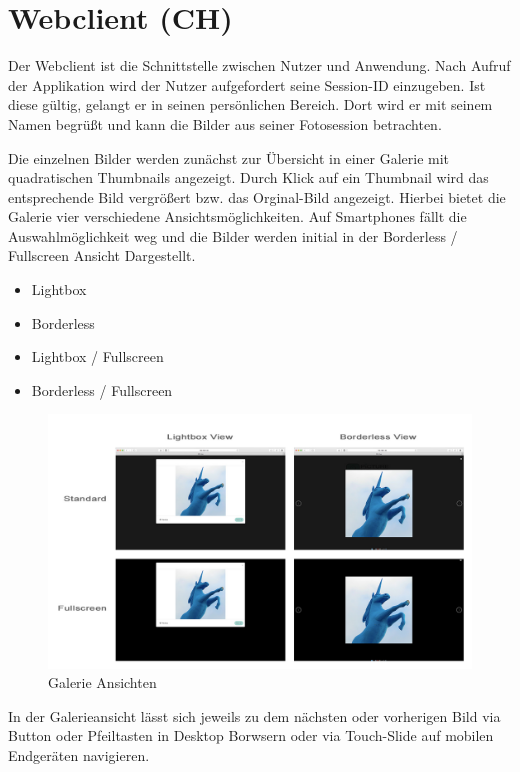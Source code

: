 \clearpage
\section{Webclient (CH)}
\label{section_webclient}
Der Webclient ist die Schnittstelle zwischen Nutzer und Anwendung. Nach Aufruf der Applikation wird der Nutzer aufgefordert seine Session-ID einzugeben. Ist diese gültig, gelangt er in seinen persönlichen Bereich. Dort wird er mit seinem Namen begrüßt und kann die Bilder aus seiner Fotosession betrachten. 

Die einzelnen Bilder werden zunächst zur Übersicht in einer Galerie mit quadratischen Thumbnails angezeigt. Durch Klick auf ein Thumbnail wird das entsprechende Bild vergrößert bzw. das Orginal-Bild angezeigt. Hierbei bietet die Galerie vier verschiedene Ansichtsmöglichkeiten. Auf Smartphones fällt die Auswahlmöglichkeit weg und die Bilder werden initial in der Borderless / Fullscreen Ansicht Dargestellt. 

\begin{itemize}
	\item Lightbox
	\item Borderless
	\item Lightbox / Fullscreen
	\item Borderless / Fullscreen
\end{itemize}

\begin{figure}[h]
	\centering
	\includegraphics[width=14cm]{bilder/gallery_view}
	\caption{Galerie Ansichten}
	\label{fig_galerie_ansichten}
\end{figure}

In der Galerieansicht lässt sich jeweils zu dem nächsten oder vorherigen Bild via Button oder Pfeiltasten in Desktop Borwsern oder via Touch-Slide auf mobilen Endgeräten navigieren. 

